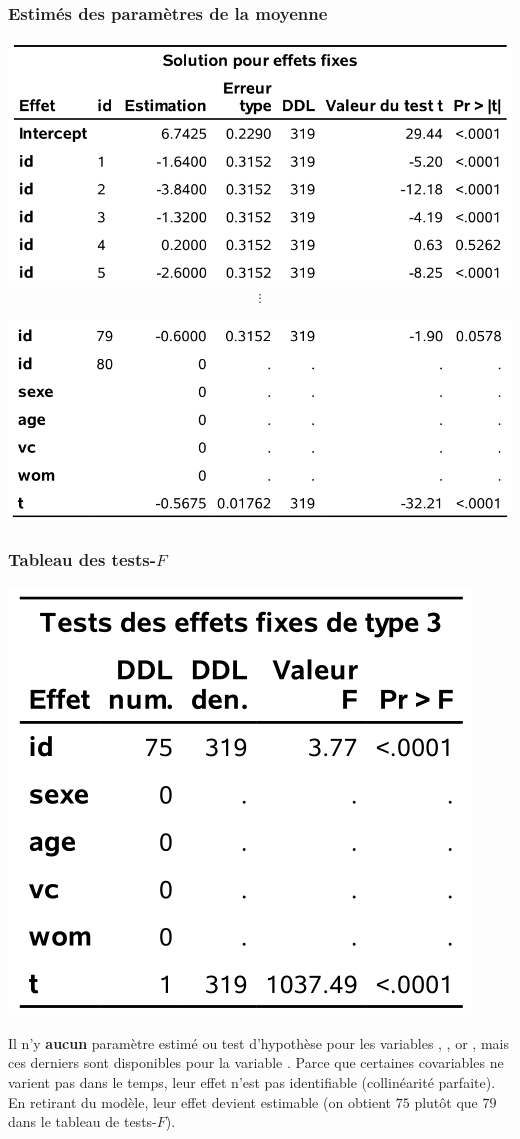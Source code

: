 \documentclass{beamer}
\begin{document}
 \begin{frame}
\frametitle{Estimés des paramètres de la moyenne}
\begin{center}
\includegraphics[width = 0.6\linewidth]{img/c6/diapos7-e01}
\begin{align*}
\vdots      
\end{align*}

\includegraphics[width = 0.6\linewidth]{img/c6/diapos7-e02}
\end{center}

\end{frame}


 \begin{frame}
\frametitle{Tableau des tests-$F$}
\begin{center}
\includegraphics[width=0.4\linewidth]{img/c6/diapos7-e03}
\end{center}
{\footnotesize 

Il n'y \textbf{aucun} paramètre estimé ou test d'hypothèse pour les variables , ,  or , mais ces derniers sont disponibles pour la variable . 
Parce que certaines covariables ne varient pas dans le temps, leur effet n'est pas identifiable (collinéarité parfaite). En retirant  du modèle, leur effet devient estimable (on obtient $75$  plutôt que $79$ dans le tableau de tests-$F$).

}
\end{frame}
\end{document}
